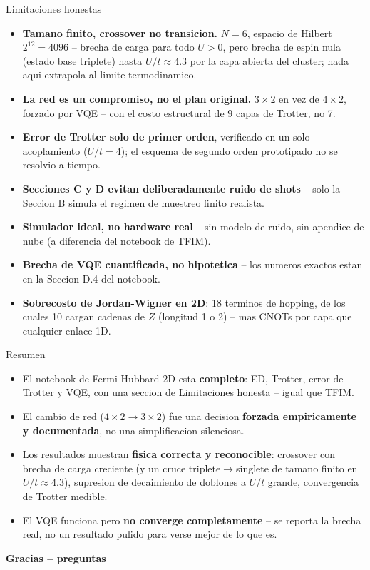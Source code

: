 \documentclass[aspectratio=169,10pt]{beamer}
\newcommand{\good}[1]{\textcolor{qAccent}{\textbf{#1}}}
\newcommand{\warn}[1]{\textcolor{qWarn}{\textbf{#1}}}
\begin{document}
\begin{frame}{Limitaciones honestas}
  \begin{itemize}
    \item \textbf{Tamano finito, crossover no transicion.} $N=6$, espacio de Hilbert
      $2^{12}{=}4096$ -- brecha de carga para todo $U>0$, pero brecha de espin nula (estado
      base triplete) hasta $U/t\approx4.3$ por la capa abierta del cluster; nada aqui
      extrapola al limite termodinamico.
    \item \textbf{La red es un compromiso, no el plan original.} $3\times2$ en vez de
      $4\times2$, forzado por VQE -- con el costo estructural de 9 capas de Trotter, no 7.
    \item \textbf{Error de Trotter solo de primer orden}, verificado en un solo acoplamiento
      ($U/t=4$); el esquema de segundo orden prototipado no se resolvio a tiempo.
    \item \textbf{Secciones C y D evitan deliberadamente ruido de shots} -- solo la Seccion B
      simula el regimen de muestreo finito realista.
    \item \textbf{Simulador ideal, no hardware real} -- sin modelo de ruido, sin apendice de
      nube (a diferencia del notebook de TFIM).
    \item \textbf{Brecha de VQE cuantificada, no hipotetica} -- los numeros exactos estan en
      la Seccion D.4 del notebook.
    \item \textbf{Sobrecosto de Jordan-Wigner en 2D}: 18 terminos de hopping, de los cuales
      10 cargan cadenas de $Z$ (longitud 1 o 2) -- mas CNOTs por capa que cualquier enlace 1D.
  \end{itemize}
\end{frame}

\begin{frame}{Resumen}
  \begin{itemize}
    \item El notebook de Fermi-Hubbard 2D esta \good{completo}: ED, Trotter, error de
      Trotter y VQE, con una seccion de Limitaciones honesta -- igual que TFIM.
    \item El cambio de red ($4\times2\to3\times2$) fue una decision \good{forzada
      empiricamente y documentada}, no una simplificacion silenciosa.
    \item Los resultados muestran \good{fisica correcta y reconocible}: crossover con brecha de carga creciente
      (y un cruce triplete$\to$singlete de tamano finito en $U/t\approx4.3$),
      supresion de decaimiento de doblones a $U/t$ grande, convergencia de Trotter medible.
    \item El VQE funciona pero \warn{no converge completamente} -- se reporta la brecha real,
      no un resultado pulido para verse mejor de lo que es.
  \end{itemize}
  \vfill
  \centering \large \textcolor{qDeep}{\textbf{Gracias -- preguntas}}
\end{frame}
\end{document}
